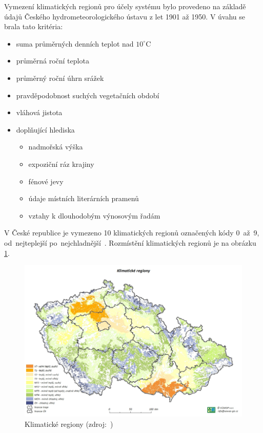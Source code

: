 Vymezení klimatických regionů pro účely systému  bylo provedeno na základě údajů Českého hydrometeorologického ústavu z let 1901 až 1950. V úvahu se brala tato kritéria:
	\begin{itemize}[leftmargin=1.5cm, noitemsep]
		\item suma průměrných denních teplot nad $10^\circ$C
		\item průměrná roční teplota
		\item průměrný roční úhrn srážek
		\item pravděpodobnost suchých vegetačních období
		\item vláhová jistota
		\item doplňující hlediska
			\begin{itemize}[leftmargin=1cm, noitemsep]
				\item nadmořská výška
				\item expoziční ráz krajiny
				\item fénové jevy
				\item údaje místních literárních pramenů
				\item vztahy k dlouhodobým výnosovým řadám
			\end{itemize}
	\end{itemize}

V České republice je vymezeno 10 klimatických regionů označených kódy 0~až~9, od~nejteplejší po~nejchladnější~\citep{vyhlaska_327}. Rozmístění klimatických regionů je na obrázku \ref{fig:klimaticke_regiony}.

	\begin{figure}[H]
		\centering
		\includegraphics[width=.9\textwidth]{./pictures/klimaticky_region.png}
		\caption[Klimatické regiony]{Klimatické regiony (zdroj:~\citep{vumop_bpej})}
		\label{fig:klimaticke_regiony}
 	\end{figure}

